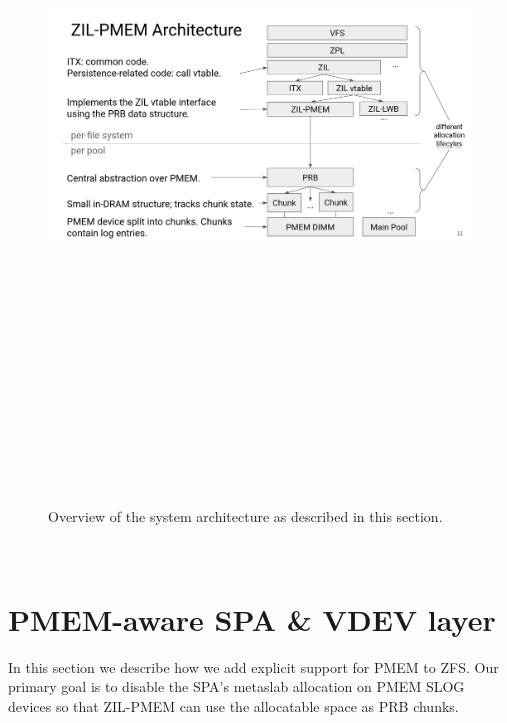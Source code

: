 \documentclass[12pt,a4paper,twoside]{book}
\begin{document}
\begin{figure}[h]
    \includegraphics[height=20cm,width=\textwidth,keepaspectratio]{fig/zilpmem_architecture_overview}
    \caption{Overview of the system architecture as described in this section.}
\end{figure}~

\section{PMEM-aware SPA \& VDEV layer}
In this section we describe how we add explicit support for PMEM to ZFS.
Our primary goal is to disable the SPA's metaslab allocation on PMEM SLOG devices so that ZIL-PMEM can use the allocatable space as PRB chunks.
\end{document}
